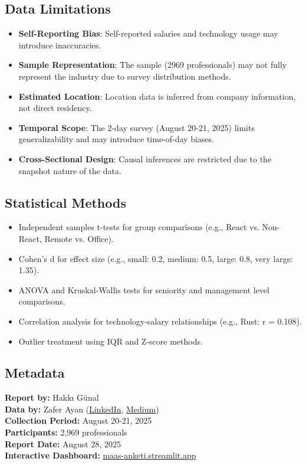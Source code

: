 \documentclass[12pt,a4paper]{article}
\begin{document}
	\subsection{Data Limitations}
	\begin{itemize}
		\item \textbf{Self-Reporting Bias}: Self-reported salaries and technology usage may introduce inaccuracies.
		\item \textbf{Sample Representation}: The sample (2969 professionals) may not fully represent the industry due to survey distribution methods.
		\item \textbf{Estimated Location}: Location data is inferred from company information, not direct residency.
		\item \textbf{Temporal Scope}: The 2-day survey (August 20-21, 2025) limits generalizability and may introduce time-of-day biases.
		\item \textbf{Cross-Sectional Design}: Causal inferences are restricted due to the snapshot nature of the data.
	\end{itemize}
	
	\subsection{Statistical Methods}
	\begin{itemize}
		\item Independent samples t-tests for group comparisons (e.g., React vs. Non-React, Remote vs. Office).
		\item Cohen’s d for effect size (e.g., small: 0.2, medium: 0.5, large: 0.8, very large: 1.35).
		\item ANOVA and Kruskal-Wallis tests for seniority and management level comparisons.
		\item Correlation analysis for technology-salary relationships (e.g., Rust: r = 0.108).
		\item Outlier treatment using IQR and Z-score methods.
	\end{itemize}
	
	\subsection{Metadata}
	\begin{center}
		\textbf{Report by:} Hakkı Günal\\
		\textbf{Data by:} Zafer Ayan (\href{https://www.linkedin.com/posts/zaferayan_geleneksel-maa%C5%9F-anketi-buyrun-httpslnkdin-activity-7363866008664629248-7YcQ}{LinkedIn}, \href{https://zaferayan.medium.com/2025-a%C4%9Fustos-detayl%C4%B1-maa%C5%9F-anketi-98446d71920a}{Medium})\\
			\textbf{Collection Period:} August 20-21, 2025\\
			\textbf{Participants:} 2,969 professionals\\
			\textbf{Report Date:} August 28, 2025\\
			\textbf{Interactive Dashboard:} \href{http://maas-anketi.streamlit.app/}{maas-anketi.streamlit.app}
			\end{center}
\end{document}

